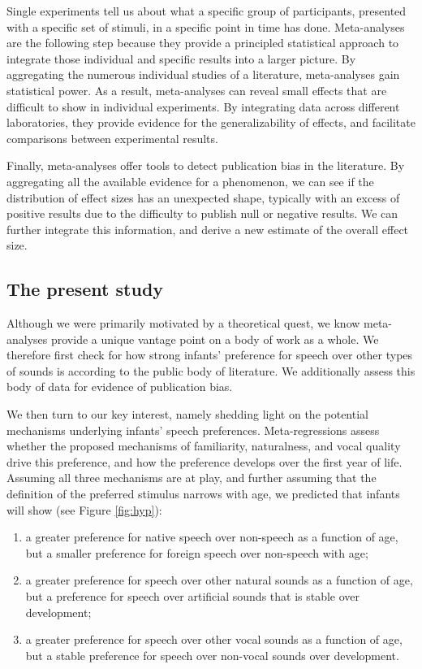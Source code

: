 \documentclass[
  man]{apa6}
\providecommand{\tightlist}{%
  \setlength{\itemsep}{0pt}\setlength{\parskip}{0pt}}
\begin{document}
Single experiments tell us about what a specific group of participants, presented with a specific set of stimuli, in a specific point in time has done. Meta-analyses are the following step because they provide a principled statistical approach to integrate those individual and specific results into a larger picture. By aggregating the numerous individual studies of a literature, meta-analyses gain statistical power. As a result, meta-analyses can reveal small effects that are difficult to show in individual experiments. By integrating data across different laboratories, they provide evidence for the generalizability of effects, and facilitate comparisons between experimental results.

Finally, meta-analyses offer tools to detect publication bias in the literature. By aggregating all the available evidence for a phenomenon, we can see if the distribution of effect sizes has an unexpected shape, typically with an excess of positive results due to the difficulty to publish null or negative results. We can further integrate this information, and derive a new estimate of the overall effect size.

\hypertarget{the-present-study}{%
\subsection{The present study}\label{the-present-study}}

Although we were primarily motivated by a theoretical quest, we know meta-analyses provide a unique vantage point on a body of work as a whole. We therefore first check for how strong infants' preference for speech over other types of sounds is according to the public body of literature. We additionally assess this body of data for evidence of publication bias.

We then turn to our key interest, namely shedding light on the potential mechanisms underlying infants' speech preferences. Meta-regressions assess whether the proposed mechanisms of familiarity, naturalness, and vocal quality drive this preference, and how the preference develops over the first year of life. Assuming all three mechanisms are at play, and further assuming that the definition of the preferred stimulus narrows with age, we predicted that infants will show (see Figure \ref{fig:hyp}):

\begin{enumerate}
\def\labelenumi{\arabic{enumi}.}
\tightlist
\item
  a greater preference for native speech over non-speech as a function of age, but a smaller preference for foreign speech over non-speech with age;
\item
  a greater preference for speech over other natural sounds as a function of age, but a preference for speech over artificial sounds that is stable over development;
\item
  a greater preference for speech over other vocal sounds as a function of age, but a stable preference for speech over non-vocal sounds over development.
\end{enumerate}
\end{document}
